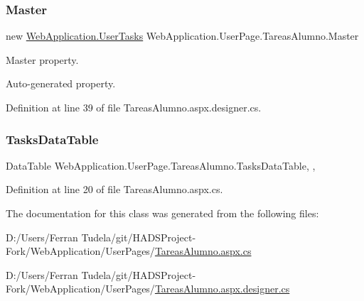 \subsubsection{\texorpdfstring{Master}{Master}}
{\footnotesize\ttfamily new \mbox{\hyperlink{classWebApplication_1_1UserTasks}{Web\+Application.\+User\+Tasks}} Web\+Application.\+User\+Page.\+Tareas\+Alumno.\+Master\hspace{0.3cm}{\ttfamily [get]}}



Master property. 

Auto-\/generated property. 

Definition at line 39 of file Tareas\+Alumno.\+aspx.\+designer.\+cs.

\mbox{\label{classWebApplication_1_1UserPage_1_1TareasAlumno_a8821f4d83835e4451c0bcc48fea3001f}} 
\subsubsection{\texorpdfstring{TasksDataTable}{TasksDataTable}}
{\footnotesize\ttfamily Data\+Table Web\+Application.\+User\+Page.\+Tareas\+Alumno.\+Tasks\+Data\+Table\hspace{0.3cm}{\ttfamily [get]}, {\ttfamily [set]}, {\ttfamily [private]}}



Definition at line 20 of file Tareas\+Alumno.\+aspx.\+cs.



The documentation for this class was generated from the following files\+:\begin{DoxyCompactItemize}
\item 
D\+:/\+Users/\+Ferran Tudela/git/\+H\+A\+D\+S\+Project-\/\+Fork/\+Web\+Application/\+User\+Pages/\mbox{\hyperlink{TareasAlumno_8aspx_8cs}{Tareas\+Alumno.\+aspx.\+cs}}\item 
D\+:/\+Users/\+Ferran Tudela/git/\+H\+A\+D\+S\+Project-\/\+Fork/\+Web\+Application/\+User\+Pages/\mbox{\hyperlink{TareasAlumno_8aspx_8designer_8cs}{Tareas\+Alumno.\+aspx.\+designer.\+cs}}\end{DoxyCompactItemize}
